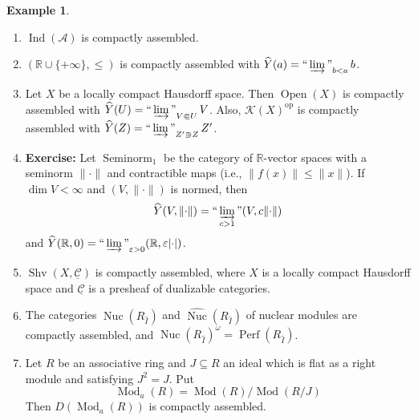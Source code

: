 \documentclass[draft]{amsart}
\newcommand{\RR}{\mathbb{R}}
\newcommand{\ul}[1]{\underline{#1}}
\newcommand{\wh}[1]{\widehat{#1}}
\newcommand{\cat}[1]{\mathcal{#1}}
\newcommand{\op}{\mathrm{op}}
\DeclareMathOperator{\Ind}{Ind}
\DeclareMathOperator{\Open}{Open}
\DeclareMathOperator{\Seminorm}{Seminorm}
\DeclareMathOperator{\Shv}{Shv}
\DeclareMathOperator{\Nuc}{Nuc}
\DeclareMathOperator{\Mod}{Mod}
\DeclareMathOperator{\Perf}{Perf}
\DeclareMathOperator*{\indinjlim}{\text{``}\varinjlim\text{''}} %
\theoremstyle{definition}
\newtheorem{ex}[thm]{Example}
\begin{document}
\begin{ex}
\begin{enumerate}[(1)]
\item $\Ind(\cat A)$ is compactly assembled.
\item $(\RR\cup \{+\infty\}, \le)$ is compactly assembled with $\wh{Y}(a) = \indinjlim_{b<a}b$.

\item Let $X$ be a locally compact Hausdorff space. Then $\Open(X)$ is compactly assembled with $\wh{Y}(U) = \indinjlim_{V\Subset U} V$. Also, $\cat K(X)^{\op}$ is compactly assembled with $\wh{Y}(Z) = \indinjlim_{Z'\Supset Z} Z'$.

\item \textbf{Exercise:} Let $\Seminorm_1$ be the category of $\RR$-vector spaces with a seminorm $\lVert\cdot\rVert$ and contractible maps (i.e., $\lVert f(x)\rVert \le \lVert x\rVert$). If $\dim V < \infty$ and $(V,\lVert\cdot\rVert)$ is normed, then
\[
\wh{Y}(V,\lVert\cdot\rVert) = \indinjlim_{c>1} (V, c \lVert\cdot\rVert)
\]
and $\wh{Y}(\RR, 0) = \indinjlim_{\varepsilon>0} (\RR,\varepsilon \lvert\cdot\rvert)$.

\item $\Shv(X,\ul{\cat C})$ is compactly assembled, where $X$ is a locally compact Hausdorff space and $\ul{\cat C}$ is a presheaf of dualizable categories.

\item The categories $\Nuc(R_{\wh{I}})$ and $\wh{\Nuc}(R_{\wh{I}})$ of nuclear modules are compactly assembled, and $\Nuc(R_{\wh{I}})^{\omega} = \Perf(R_{\wh{I}})$.

\item Let $R$ be an associative ring and $J\subseteq R$ an ideal which is flat as a right module and satisfying $J^2 = J$. Put
\[
\Mod_a(R) = \Mod(R)/\Mod(R/J)
\]
Then $D(\Mod_a(R))$ is compactly assembled.
\end{enumerate}
\end{ex}
\end{document}
